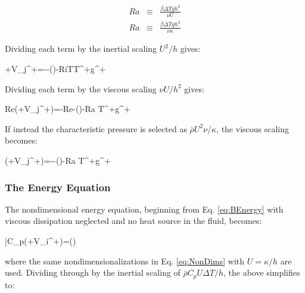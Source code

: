 \documentclass[10pt]{article}
\newcounter{subsubsubsection}[subsubsection]
\numberwithin{equation}{section} %
\begin{document}
\begin{subequations}
\label{eq:Rayleigh}
\begin{eqnarray}
Ra&\equiv&\frac{\beta\Delta T gh^2}{\nu U}\\
Ra&\equiv&\frac{\beta\Delta T gh^3}{\nu \kappa}
\end{eqnarray}
\end{subequations}

Dividing each term by the inertial scaling \(U^2/h\) gives:

\beq
{}+V_j^+=--\left(\right)-Ri\beta \Delta TT^+g^+
\eeq

Dividing each term by the viscous scaling \(\nu U/h^2\) gives:

\beq
\label{eq:NonDim2}
Re\left(+V_j^+\right)=-Re-\left(\right)-Ra T^+g^+
\eeq

If instead the characteristic pressure is selected as \(\bar{\rho}U^2\nu/\kappa\), the viscous scaling becomes:

\beq
\label{eq:NonDim3}
\left(+V_j^+\right)=--\left(\right)-Ra T^+g^+
\eeq

\subsubsection{The Energy Equation}
\label{sec:EnergyDim}

The nondimensional energy equation, beginning from Eq. \eqref{eq:BEnergy} with viscous dissipation neglected \cite{spiegel} and no heat source in the fluid, becomes:

\beq
\bar{\rho}C_p\left(+V_i^+\right)=\left(\right)
\eeq

where the same nondimensionalizations in Eq. \eqref{eq:NonDims} with \(U=\kappa/h\) are used. Dividing through by the inertial scaling of \(\bar{\rho}C_pU\Delta T/h\), the above simplifies to:
\end{document}
